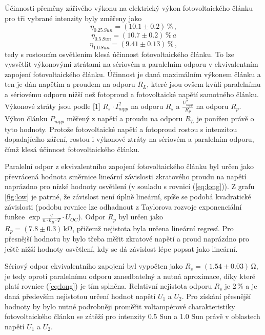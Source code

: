 \documentclass{../concepts/prepareprotokol} %
\begin{document}
Účinnosti přeměny zářivého výkonu na elektrický výkon fotovoltaického článku pro tři vybrané intenzity byly změřeny jako
\begin{equation*}
    \eta_{0.25 \, Sun} = (10.1 \pm 0.2)\,\% \, ,
\end{equation*}
\begin{equation*}
    \eta_{0.5 \, Sun} = (10.7 \pm 0.2)\,\% \, a
\end{equation*}
\begin{equation*}
    \eta_{1.0 \, Sun} = (9.41 \pm 0.13)\,\% \, ,
\end{equation*}
tedy s rostoucím osvětlením klesá účinnost fotovoltaického článku. To lze vysvětlit výkonovými ztrátami na sériovém a paralelním odporu v ekvivalentním zapojení fotovoltaického článku. Účinnost je daná maximálním výkonem článku a ten je dán napětím a proudem na odporu $R_L$, které jsou ovšem kvůli paralelnímu a sériovému odporu nižší než fotoproud a fotovoltaické napětí samotného článku. Výkonové ztráty jsou podle [1] $R_s \cdot I_{mpp}^2$ na odporu $R_s$ a $\frac{U_{mpp}^2}{R_p}$ na odporu $R_p$. Výkon článku $P_{mpp}$ měřený z napětí a proudu na odporu $R_L$ je ponížen právě o tyto hodnoty. Protože fotovoltaické napětí a fotoproud rostou s intenzitou dopadajícího záření, rostou i výkonové ztráty na sériovém a paralelním odporu, čímž klesá účinnost fotovoltaického článku.

Paralelní odpor z ekvivalentního zapojení fotovoltaického článku byl určen jako převrácená hodnota směrnice lineární závislosti zkratového proudu na napětí naprázdno pro nízké hodnoty osvětlení (v souladu s rovnicí (\ref{eq:long})). Z grafu \ref{fig:low} je patrné, že závislost není úplně lineární, spíše se podobá kvadratické závislosti (podobu rovnice lze odhadnout z Taylorova rozvoje exponenciální funkce $\exp{\frac{q}{n \cdot k_B \cdot T} \cdot U_{OC}}$). Odpor $R_p$ byl určen jako \\ $R_p = (7.8 \pm 0.3) \, \si{\kilo\ohm}$, přičemž nejistota byla určena lineární regresí. Pro přesnější hodnotu by bylo třeba měřit zkratové napětí a proud naprázdno pro ještě nižší hodnoty osvětlení, kdy se dá závislost lépe popsat jako lineární.

Sériový odpor ekvivalentního zapojení byl vypočten jako $R_s = (1.54 \pm 0.03) \, \si{\ohm}$, je tedy oproti paralelnímu odporu zanedbatelný a nutná aproximace, díky které platí rovnice (\ref{eq:long}) je tím splněna. Relativní nejistota odporu $R_s$ je 2\,\% a je daná především nejistotou určení hodnot napětí $U_1$ a $U_2$. Pro získání přesnější hodnoty by bylo nutné podrobněji proměřit voltampérové charakteristiky fotovoltaického článku se zátěží pro intenzity 0.5 Sun a 1.0 Sun právě v oblastech napětí $U_1$ a $U_2$.
\end{document}
